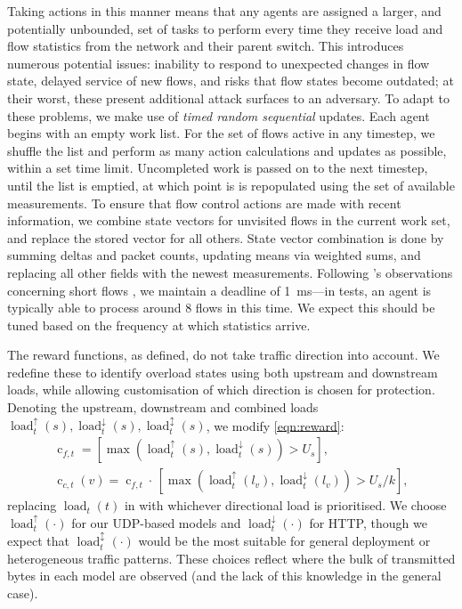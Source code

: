 \documentclass[conference, a4paper, 10pt, times]{IEEEtran}
\newcommand{\fakepara}[1]{\noindent\textbf{#1:}}
\begin{document}
Taking actions in this manner means that any agents are assigned a larger, and potentially unbounded, set of tasks to perform every time they receive load and flow statistics from the network and their parent switch.
This introduces numerous potential issues: inability to respond to unexpected changes in flow state, delayed service of new flows, and risks that flow states become outdated; at their worst, these present additional attack surfaces to an adversary.
To adapt to these problems, we make use of \emph{timed random sequential} updates.
Each agent begins with an empty work list.
For the set of flows active in any timestep, we shuffle the list and perform as many action calculations and updates as possible, within a set time limit.
Uncompleted work is passed on to the next timestep, until the list is emptied, at which point is is repopulated using the set of available measurements.
To ensure that flow control actions are made with recent information, we combine state vectors for unvisited flows in the current work set, and replace the stored vector for all others.
State vector combination is done by summing deltas and packet counts, updating means via weighted sums, and replacing all other fields with the newest measurements.
Following \citeauthor{DBLP:conf/sigcomm/ChenL0L18}'s observations concerning short flows \cite{DBLP:conf/sigcomm/ChenL0L18}, we maintain a deadline of \SI{1}{\milli\second}---in tests, an agent is typically able to process around 8 flows in this time.
We expect this should be tuned based on the frequency at which statistics arrive.

\newcommand{\arrload}[2]{\operatorname{load}^{#2}_{t}(#1)}
\newcommand{\uload}[1]{\arrload{#1}{\uparrow}}
\newcommand{\dload}[1]{\arrload{#1}{\downarrow}}
\newcommand{\bload}[1]{\arrload{#1}{\updownarrow}}
\newcommand{\cond}[2]{\operatorname{c}_{#1,t}#2}
The reward functions, as defined, do not take traffic direction into account.
We redefine these to identify overload states using both upstream and downstream loads, while allowing customisation of which direction is chosen for protection.
Denoting the upstream, downstream and combined loads $\uload{s}, \dload{s}, \bload{s}$, we modify \cref{eqn:reward}:
\begin{subequations}
\begin{gather}
\cond{f} = [\max(\uload{s}, \dload{s}) > U_s],\\
\cond{c}{(v)} = \cond{f}{} \cdot{} \, [\max(\uload{l_v}, \dload{l_v}) > U_s/k],
\end{gather}
\label{eqn:reward-but-better}
\end{subequations}
replacing $\arrload{t}{}$ in  with whichever directional load is prioritised.
We choose $\uload{\cdot}$ for our UDP-based models and $\dload{\cdot}$ for HTTP, though we expect that $\bload{\cdot}$ would be the most suitable for general deployment or heterogeneous traffic patterns.
These choices reflect where the bulk of transmitted bytes in each model are observed (and the lack of this knowledge in the general case).
\end{document}
